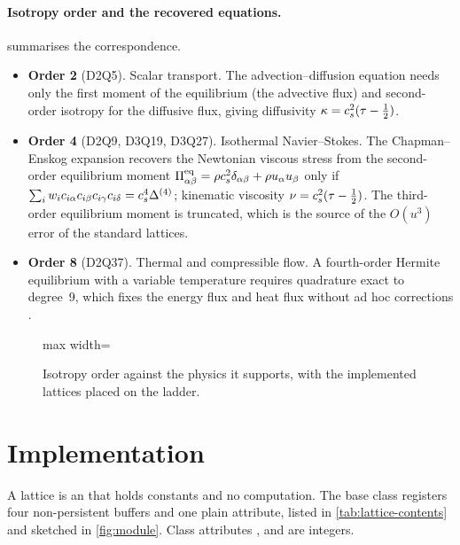 \paragraph{Isotropy order and the recovered equations.}
 summarises the correspondence.
\begin{itemize}[nosep]
\item \textbf{Order 2} (D2Q5). Scalar transport. The advection--diffusion equation needs
      only the first moment of the equilibrium (the advective flux) and second-order isotropy
      for the diffusive flux, giving diffusivity $\kappa = c_s^2(\tau - \tfrac12)$.
\item \textbf{Order 4} (D2Q9, D3Q19, D3Q27). Isothermal Navier--Stokes. The Chapman--Enskog
      expansion recovers the Newtonian viscous stress from the second-order equilibrium
      moment $\Pi^{\mathrm{eq}}_{\alpha\beta} = \rho c_s^2\delta_{\alpha\beta} + \rho u_\alpha
      u_\beta$ only if $\sum_i w_i c_{i\alpha}c_{i\beta}c_{i\gamma}c_{i\delta} = c_s^4
      \Delta^{(4)}$; kinematic viscosity $\nu = c_s^2(\tau - \tfrac12)$. The third-order
      equilibrium moment is truncated, which is the source of the $O(u^3)$ error of the
      standard lattices.
\item \textbf{Order 8} (D2Q37). Thermal and compressible flow. A fourth-order Hermite
      equilibrium with a variable temperature requires quadrature exact to degree~9,
      which fixes the energy flux and heat flux without ad hoc corrections
      \parencite{Philippi2006,ShanYuanChen2006,Sbragaglia2009}.
\end{itemize}

\begin{figure}[h]
\centering
\begin{adjustbox}{max width=\linewidth}\end{adjustbox}
\caption{Isotropy order against the physics it supports, with the implemented lattices placed
on the ladder.}
\label{fig:ladder}
\end{figure}


\section{Implementation}\label{sec:lattice-impl}

A lattice is an  that holds constants and no computation. The base class
 registers four non-persistent buffers and one plain attribute, listed in
\cref{tab:lattice-contents} and sketched in \cref{fig:module}. Class attributes ,
 and  are integers.

